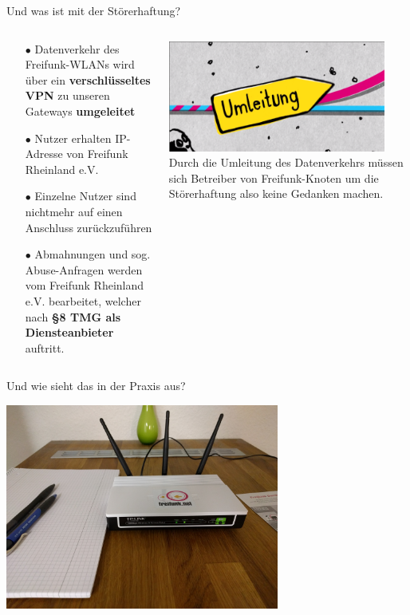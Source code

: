 \documentclass[10pt]{beamer}
\begin{document}
  \begin{frame}{Und was ist mit der Störerhaftung?}
    \begin{columns}[T]
     \begin{column}{5cm}
        \begin{itemize}
          \item[\textcolor{freifunkpink}{\Large$\bullet$}] Datenverkehr des Freifunk-WLANs wird über ein \textbf{verschlüsseltes VPN} zu unseren Gateways \textbf{umgeleitet}
          \item[\textcolor{freifunkpink}{\Large$\bullet$}] Nutzer erhalten IP-Adresse von Freifunk Rheinland e.V.
          \item[\textcolor{freifunkpink}{\Large$\bullet$}] Einzelne Nutzer sind nichtmehr auf einen Anschluss zurückzuführen
          \item[\textcolor{freifunkpink}{\Large$\bullet$}] Abmahnungen und sog. Abuse-Anfragen werden vom Freifunk Rheinland e.V. bearbeitet, welcher nach \textbf{§8 TMG als Diensteanbieter} auftritt.
        \end{itemize}
      \end{column}
      \begin{column}{5cm}
        \includegraphics[width=0.9\textwidth]{images/umleitung}
        \vspace{1em}
           Durch die Umleitung des Datenverkehrs müssen sich Betreiber von Freifunk-Knoten um die Störerhaftung also keine Gedanken machen.
        \vspace{1em}
      \end{column}
    \end{columns}
  \end{frame}

  \begin{frame}{Und wie sieht das in der Praxis aus?}
    \begin{center}
      \includegraphics[width=9cm]{images/homerouter}
    \end{center}
  \end{frame}
\end{document}
